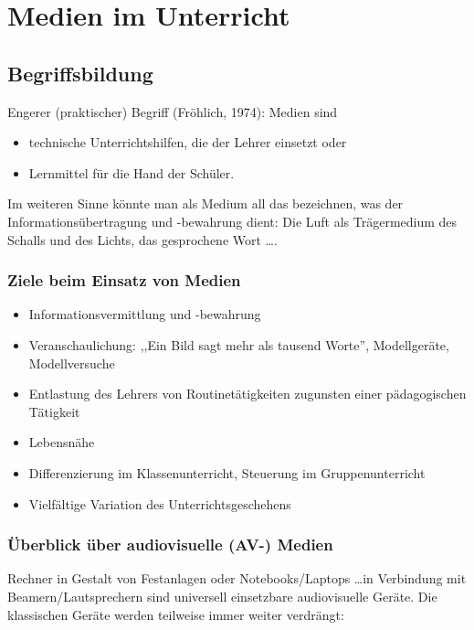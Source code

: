 \chapter{Medien im Unterricht}\label{Medien}

\section{Begriffsbildung}
Engerer (praktischer) Begriff (Fr\"{o}hlich, 1974): Medien sind
\begin{itemize}
\item
technische Unterrichtshilfen, die der Lehrer einsetzt oder
\item
Lernmittel f\"{u}r die Hand der Sch\"{u}ler.
\end{itemize}

Im weiteren Sinne k\"{o}nnte man als Medium all das bezeichnen, was der
Informations\"{u}bertragung und -bewahrung dient:
Die Luft als Tr\"{a}germedium
des Schalls und des Lichts, das gesprochene Wort \dots.

\subsection{Ziele beim Einsatz von Medien}
\begin{itemize}
\item
Informationsvermittlung und -bewahrung
\item
Veranschaulichung: ,,Ein Bild sagt mehr als tausend Worte'',
Modellger\"{a}te, Modellversuche
\item
Entlastung des Lehrers von Routine\-t\"{a}tigkeiten zugunsten einer
p\"{a}dagogischen T\"{a}tigkeit
\item
Lebensn\"{a}he
\item
Differenzierung im Klassenunterricht, Steuerung
im Gruppenunterricht
\item
Vielf\"{a}ltige Variation des Unterrichtsgeschehens
\end{itemize}

\subsection{\"{U}berblick \"{u}ber audiovisuelle (AV-) Medien}

Rechner in Gestalt von Festanlagen oder Notebooks/Laptops \dots in Verbindung mit Beamern/Lautsprechern
sind universell einsetzbare audiovisuelle Ger\"{a}te.
Die klassischen Ger\"{a}te werden teilweise immer weiter verdr\"{a}ngt:

